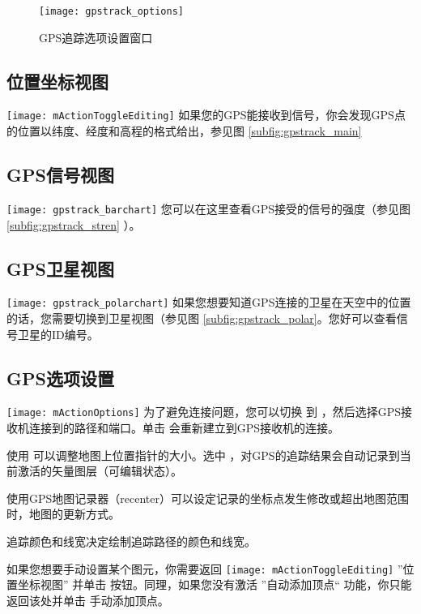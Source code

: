 \begin{figure}[ht]
   \centering
   \texttt{[image: gpstrack\_options]}
   \caption{GPS追踪选项设置窗口 \nixcaption}
   \label{fig:gpstrack_options}
\end{figure}

\subsection{位置坐标视图}
\texttt{[image: mActionToggleEditing]} 如果您的GPS能接收到信号，你会发现GPS点的位置以纬度、经度和高程的格式给出，参见图 \ref{subfig:gpstrack_main}

\subsection{GPS信号视图}
\texttt{[image: gpstrack\_barchart]} 您可以在这里查看GPS接受的信号的强度（参见图 \ref{subfig:gpstrack_stren} ）。

\subsection{GPS卫星视图}
\texttt{[image: gpstrack\_polarchart]} 如果您想要知道GPS连接的卫星在天空中的位置的话，您需要切换到卫星视图（参见图 \ref{subfig:gpstrack_polar}。您好可以查看信号卫星的ID编号。

\subsection{GPS选项设置}
\texttt{[image: mActionOptions]} 为了避免连接问题，您可以切换  到  ，然后选择GPS接收机连接到的路径和端口。单击  会重新建立到GPS接收机的连接。

使用  可以调整地图上位置指针的大小。选中  ，对GPS的追踪结果会自动记录到当前激活的矢量图层（可编辑状态）。

使用GPS地图记录器（recenter）可以设定记录的坐标点发生修改或超出地图范围时，地图的更新方式。

追踪颜色和线宽决定绘制追踪路径的颜色和线宽。

如果您想要手动设置某个图元，你需要返回 \texttt{[image: mActionToggleEditing]} ''位置坐标视图'' 并单击  按钮。同理，如果您没有激活 ''自动添加顶点`` 功能，你只能返回该处并单击  手动添加顶点。

\FloatBarrier
